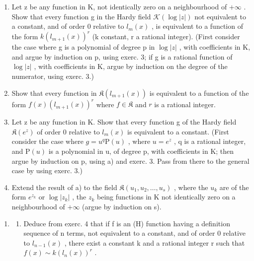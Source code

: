 \begin{enumerate}
\def\labelenumi{\alph{enumi})}
\item
  Let z be any function in K, not identically zero on a neighbourhood of \(+\infty\) . Show that every function g in the Hardy field \(\mathcal{K}(\log|z|)\) not equivalent to a constant, and of order 0 relative to \(l_{m}(x)\) , is equivalent to a function of the form \(k(l_{m+1}(x))^{r}\) (k constant, r a rational integer). (First consider the case where g is a polynomial of degree p in \(\log|z|\) , with coefficients in K, and argue by induction on p, using exerc. 3; if g is a rational function of \(\log|z|\) , with coefficients in K, argue by induction on the degree of the numerator, using exerc. 3.)
\item
  Show that every function in \(\mathfrak{K}(l_{m+1}(x))\) is equivalent to a function of the form \(f(x)(l_{m+1}(x))^r\) where \(f \in \mathfrak{K}\) and \(r\) is a rational integer.
\item
  Let z be any function in K. Show that every function g of the Hardy field \(\mathfrak{K}(e^{z})\) of order 0 relative to \(l_{m}(x)\) is equivalent to a constant. (First consider the case where \(g = u^{q} \mathrm{P}(u)\) , where \(u = e^{z}\) , q is a rational integer, and \(\mathrm{P}(u)\) is a polynomial in u, of degree p, with coefficients in K; then argue by induction on p, using a) and exerc. 3. Pass from there to the general case by using exerc. 3.)
\item
  Extend the result of a) to the field \(\mathfrak{K}(u_{1}, u_{2}, \ldots, u_{s})\) , where the \(u_{k}\) are of the form \(e^{z_{k}}\) or \(\log |z_{k}|\) , the \(z_{k}\) being functions in K not identically zero on a neighbourhood of \(+\infty\) (argue by induction on s).
\end{enumerate}

\begin{enumerate}
\def\labelenumi{\arabic{enumi})}
\setcounter{enumi}{4}
\tightlist
\item
  \begin{enumerate}
  \def\labelenumii{\alph{enumii})}
  \tightlist
  \item
    Deduce from exerc. 4 that if f is an (H) function having a definition sequence of n terms, not equivalent to a constant, and of order 0 relative to \(l_{n-1}(x)\) , there exist a constant k and a rational integer r such that \(f(x) \sim k(l_n(x))^r\) .
  \end{enumerate}
\end{enumerate}

